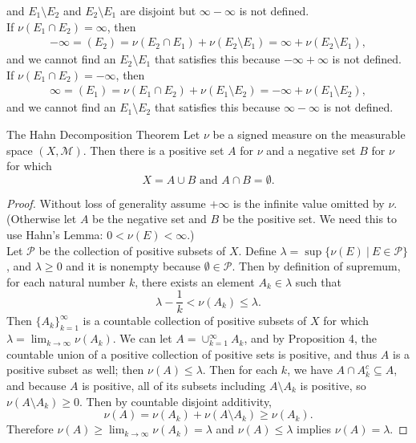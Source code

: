 \begin{flushleft}
		and $E_1\setminus E_2$ and $E_2\setminus E_1$ are disjoint but $\infty-\infty$ is not defined.
		\\If $\nu(E_1\cap E_2)=\infty$, then 
		\begin{align*}
			-\infty=(E_2)=\nu(E_2\cap E_1)+\nu(E_2\setminus E_1)=\infty+\nu(E_2\setminus E_1),
		\end{align*}
		and we cannot find an $E_2\setminus E_1$ that satisfies this because $-\infty+\infty$ is not defined.
		\\If $\nu(E_1\cap E_2)=-\infty$, then 
		\begin{align*}
			\infty=(E_1)=\nu(E_1\cap E_2)+\nu(E_1\setminus E_2)=-\infty+\nu(E_1\setminus E_2),
		\end{align*}
		and we cannot find an $E_1\setminus E_2$ that satisfies this because $\infty-\infty$ is not defined.
	\begin{namedthm*}{The Hahn Decomposition Theorem}
		Let $\nu$ be a signed measure on the measurable space $(X,\mathcal{M})$.
		Then there is a positive set $A$ for $\nu$ and a negative set $B$ for $\nu$ for which
		\[
			X=A\cup B\text{ and }A\cap B=\emptyset.	
		\]
	\end{namedthm*}
	\begin{proof}
		Without loss of generality assume $+\infty$ is the infinite value omitted by $\nu$.
		(Otherwise let $A$ be the negative set and $B$ be the positive set. We need this to use Hahn's Lemma: $0<\nu(E)<\infty$.)
		\\Let $\mathcal{P}$ be the collection of positive subsets of $X$.
		Define $\lambda=\sup\{\nu(E)\ |\ E\in\mathcal{P}\}$, and $\lambda\ge0$ and it is nonempty because $\emptyset\in\mathcal{P}$.
		Then by definition of supremum, for each natural number $k$, there exists an element $A_k\in\lambda$ such that
		\[
			\lambda-\frac{1}{k}<\nu(A_k)\le\lambda.
		\]
		Then $\{A_k\}_{k=1}^\infty$ is a countable collection of positive subsets of $X$ for which $\lambda=\lim_{k\to\infty}\nu(A_k)$.
		We can let $A=\cup_{k=1}^\infty A_k$, and by Proposition 4, the countable union of a positive collection of positive sets is positive, and thus $A$ is a positive subset as well; then $\nu(A)\le\lambda$.
		Then for each $k$, we have $A\cap A_k^c\subseteq A$, and because $A$ is positive, all of its subsets including $A\setminus A_k$ is positive, so $\nu(A\setminus A_k)\ge0$.
		Then by countable disjoint additivity,
		\[
			\nu(A)=\nu(A_k)+\nu(A\setminus A_k)\ge\nu(A_k).
		\]
		Therefore $\nu(A)\ge\lim_{k\to\infty}\nu(A_k)=\lambda$ and $\nu(A)\le\lambda$ implies $\nu(A)=\lambda$.

\end{proof}
\end{flushleft}

